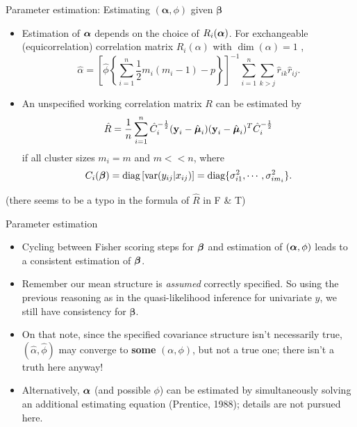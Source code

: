 \documentclass{beamer}
\newcommand{\boldbeta}{{\boldsymbol \beta}}
\newcommand{\boldalpha}{{\boldsymbol \alpha}}
\newenvironment{wideitemize}%
  {\begin{itemize}%
    \setlength{\parskip}{1em}}%
  {\end{itemize}}
\begin{document}
\begin{frame} {Parameter estimation: Estimating $(\boldalpha, \phi)$ given $\boldbeta$}

\begin{itemize}
\item
Estimation of $\mbox{\boldmath $\alpha$}$ depends on the choice of $R_i(\mbox{\boldmath $\alpha$})$.
For exchangeable (equicorrelation) correlation matrix $R_i(\alpha)$ with $\dim (\alpha)=1$ , 
$$\hat{\alpha}=\left[\hat{\phi}\left\{\sum_{i=1}^n\frac{1}{2}m_i(m_i-1)-p\right\}\right]^{-1}
\sum_{i=1}^n\sum_{k>j}\hat{r}_{ik}\hat{r}_{ij}.$$
\item
An unspecified working correlation matrix $R$ can be estimated by
$$\hat{R}=\frac{1}{n }\sum_{i=1}^n \hat{C}_i^{-\frac{1}{2}}(\textbf{y}_i-\hat{\mbox{\boldmath
$\mu$}}_i)(\textbf{y}_i-\hat{\mbox{\boldmath $\mu$}}_i)^T\hat{C}_i^{-\frac{1}{2}}$$
if all cluster sizes $m_i=m$ and $m<<n$, where 
\[
C_i(\mbox{\boldmath $\beta$})=\mbox{diag}\left[\mbox{var}(y_{ij}|x_{ij})\right]
=\mbox{diag}\{\sigma_{i1}^2,\cdots, \sigma_{im_i}^2\}.\]\end{itemize}
(there seems to be a typo in the formula of $\hat{R}$ in F \& T)
\end{frame}

\begin{frame}{Parameter estimation}
\begin{wideitemize}
\item
Cycling between Fisher scoring steps for $\mbox{\boldmath $\beta$}$ and estimation of
$(\mbox{\boldmath $\alpha$}, \phi)$ leads to a consistent estimation of $\mbox{\boldmath $\beta$}$.

\item Remember our mean structure is \emph{assumed} correctly specified. So using the previous reasoning as in the quasi-likelihood inference for univariate $y$, we still have consistency for $\boldbeta$. 

\item On that note, since the specified covariance structure isn't necessarily true, $(\hat{\alpha}, \hat{\phi})$ may converge to {\bf some} $(\alpha, \phi)$, but not a true one; there isn't a truth here anyway! 

\item
Alternatively, $\mbox{\boldmath $\alpha$}$ (and possible $\phi$) can be estimated by simultaneously
solving an additional estimating equation (Prentice, 1988); details are not pursued here.

\end{wideitemize}
\end{frame}
\end{document}
